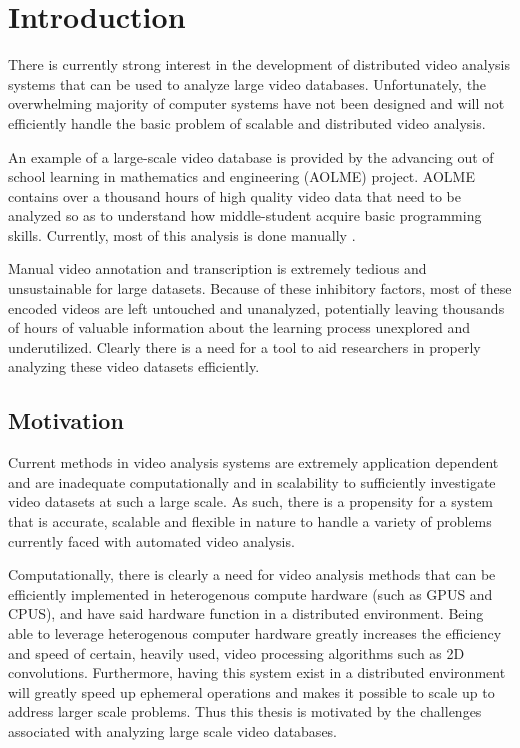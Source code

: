 \chapter{Introduction}
There is currently strong interest in the development of distributed video
   analysis systems that can be used to analyze large video databases.
Unfortunately, the overwhelming majority of computer systems
   have not been designed and will not efficiently handle
   the basic problem of scalable and distributed video analysis.
   
An example of a large-scale video database is 
   provided by the
   advancing out of school learning in mathematics and engineering (AOLME)
   project.
AOLME contains over a thousand hours of high quality video
   data that need to be analyzed so as to understand how
   middle-student acquire basic programming skills.
Currently, most of this analysis is done manually \cite{LopezLeiva2016}. 

Manual video annotation and transcription
   is extremely tedious and unsustainable for large datasets.    
Because of these inhibitory factors, most of
   these encoded videos are left untouched and unanalyzed, potentially leaving
   thousands of hours of valuable information about the learning process unexplored
   and  underutilized. 
Clearly there is a need for a tool to aid researchers in
   properly analyzing these video datasets efficiently.

\section{\label{section:motivation}Motivation}

Current methods in video analysis systems 
   are extremely application dependent and are inadequate
  computationally and in scalability to sufficiently investigate video datasets at such
a large scale. As such, there is a propensity for a system that is accurate,
scalable and flexible in nature to handle a variety of problems currently faced
with automated video analysis.

Computationally, there is clearly a need for video analysis methods that can be
efficiently implemented in heterogenous compute hardware (such as GPUS and
CPUS), and have said hardware function in a distributed environment. Being able
to leverage heterogenous computer hardware greatly increases the efficiency and
speed of certain, heavily used, video processing algorithms such as 2D
convolutions. Furthermore, having this system exist in a distributed environment
will greatly speed up ephemeral operations and makes it possible to scale up
to address larger scale problems.
Thus this thesis is motivated
   by the challenges associated with analyzing large scale video databases.

